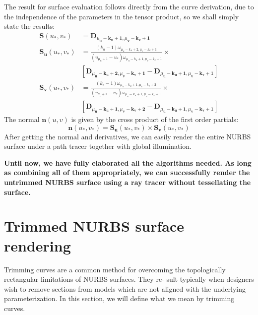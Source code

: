 \documentclass[acmtog]{acmart}
\begin{document}
The result for surface evaluation follows directly from the curve derivation, due to the independence of the parameters in the tensor product, so we shall simply state the results:
$$
\begin{aligned}
\mathbf{S}\left(u_*, v_*\right) & =\mathbf{D}_{\mu_{\mathbf{u}}-\mathbf{k}_{\mathbf{u}}+\mathbf{1}, \mu_{\mathbf{v}}-\mathbf{k}_{\mathbf{v}}+\mathbf{1}} \\
\mathbf{S}_{\mathbf{u}}\left(u_*, v_*\right) & =\frac{\left(k_u-1\right) \omega_{\mu_u-k_u+2, \mu_v-k_v+1}}{\left(u_{\mu_u+1}-u_*\right) \omega_{\mu_u-k_u+1, \mu_v-k_v+1}}\times \\
&\left[\mathbf{D}_{\mu_{\mathbf{u}}-\mathbf{k}_{\mathbf{u}}+\mathbf{2}, \mu_{\mathbf{v}}-\mathbf{k}_{\mathbf{v}}+\mathbf{1}}-\mathbf{D}_{\mu_{\mathbf{u}}-\mathbf{k}_{\mathbf{u}}+\mathbf{1}, \mu_{\mathbf{v}}-\mathbf{k}_{\mathbf{v}}+\mathbf{1}}\right] \\
\mathbf{S}_{\mathbf{v}}\left(u_*, v_*\right) & =\frac{\left(k_v-1\right) \omega_{\mu_u-k_u+1, \mu_v-k_v+2}}{\left(v_{\mu_v+1}-v_*\right) \omega_{\mu_u-k_u+1, \mu_v-k_v+1}}\times\\
&\left[\mathbf{D}_{\mu_{\mathbf{u}}-\mathbf{k}_{\mathbf{u}}+\mathbf{1}, \mu_{\mathbf{v}}-\mathbf{k}_{\mathbf{v}}+\mathbf{2}}-\mathbf{D}_{\mu_{\mathbf{u}}-\mathbf{k}_{\mathbf{u}}+\mathbf{1}, \mu_{\mathbf{v}}-\mathbf{k}_{\mathbf{v}}+\mathbf{1}}\right]
\end{aligned}
$$
The normal $\mathbf{n}(u, v)$ is given by the cross product of the first order partials:
$$
\mathbf{n}\left(u_*, v_*\right)=\mathbf{S}_{\mathbf{u}}\left(u_*, v_*\right) \times \mathbf{S}_{\mathbf{v}}\left(u_*, v_*\right)
$$
After getting the normal and derivatives, we can easily render the entire NURBS surface under a path tracer together with global illumination.

\textbf{Until now, we have fully elaborated all the algorithms needed. As long as combining all of them appropriately, we can successfully render the untrimmed NURBS surface using a ray tracer without tessellating the surface.}

\section{Trimmed NURBS surface rendering}
\hspace*{8pt}
Trimming curves are a common method for overcoming the topologically rectangular limitations of NURBS surfaces. They re- sult typically when designers wish to remove sections from models which are not aligned with the underlying parameterization. In this section, we will define what we mean by trimming curves.
\end{document}
